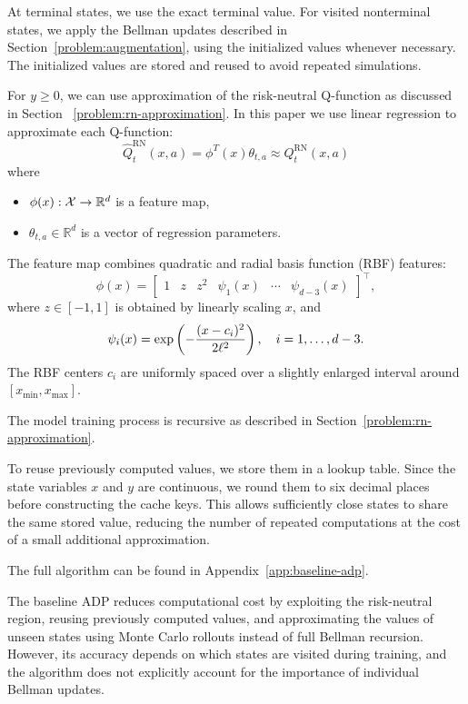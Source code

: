 At terminal states, we use the exact terminal value. For visited nonterminal states, we apply the Bellman updates described in Section~\ref{problem:augmentation}, using the initialized values whenever necessary. The initialized values are stored and reused to avoid repeated simulations.

For $y \geq 0$, we can use approximation of the risk-neutral Q-function as discussed in Section~ \ref{problem:rn-approximation}. In this paper we use linear regression to approximate each Q-function:
\begin{equation}
	\hat{Q}_t^{\text{RN}}(x, a) = \phi^T(x) \theta_{t, a} \approx Q_t^{\text{RN}}(x, a)
	\label{linear-q-approx}
\end{equation}
where 
\begin{itemize}
	\item $\phi(x): \mathcal{X} \to \mathbb{R}^{d}$ is a feature map,
	\item $\theta_{t, a} \in \mathbb{R}^{d}$ is a vector of regression parameters.
\end{itemize}
The feature map combines quadratic and radial basis function (RBF)
features:
\begin{equation}
	\phi(x) =
	\begin{bmatrix}
		1 & z & z^2 & \psi_1(x) & \cdots & \psi_{d-3}(x)
	\end{bmatrix}^{\top},
	\label{feature-map}
\end{equation}
where $z \in [-1,1]$ is obtained by linearly scaling $x$, and
\begin{equation}
	\psi_i(x) = \exp\left(-\frac{(x-c_i)^2}{2\ell^2}\right), \quad i=1,\ldots,d-3.
	\notag
	\label{rbf}
\end{equation}
The RBF centers $c_i$ are uniformly spaced over a slightly enlarged interval around $[x_{\min},x_{\max}]$.

The model training process is recursive as described in Section~\ref{problem:rn-approximation}. 

To reuse previously computed values, we store them in a lookup table. Since the state variables $x$ and $y$ are continuous, we round them to six decimal places before constructing the cache keys. This allows sufficiently close states to share the same stored value, reducing the number of repeated computations at the cost of a small additional approximation.

The full algorithm can be found in Appendix~\ref{app:baseline-adp}.

The baseline ADP reduces computational cost by exploiting the risk-neutral region, reusing previously computed values, and approximating the values of unseen states using Monte Carlo rollouts instead of full Bellman recursion. However, its accuracy depends on which states are visited during training, and the algorithm does not explicitly account for the importance of individual Bellman updates.

